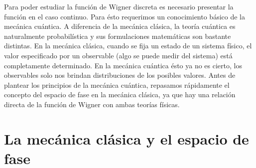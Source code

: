 \documentclass[a4paper]{report}
\begin{document}
  Para poder estudiar la función de Wigner discreta es
  necesario presentar la función en el caso continuo. Para
  ésto requerimos un conocimiento básico de la mecánica
  cuántica. A diferencia de la mecánica clásica, la teoría
  cuántica es naturalmente probabilística y sus
  formulaciones matemáticas son bastante distintas. En la
  mecánica clásica, cuando se fija un estado de un sistema
  físico, el valor especificado por un observable (algo se
  puede medir del sistema) está completamente determinado.
  En la mecánica cuántica ésto ya no es cierto, los
  observables solo nos brindan distribuciones de los
  posibles valores. Antes de plantear los principios de la
  mecánica cuántica, repasamos rápidamente el concepto del
  espacio de fase en la mecánica clásica, ya que hay una
  relación directa de la función de Wigner con ambas teorías
  físicas.

  \section{La mecánica clásica y el espacio de fase}
\end{document}
